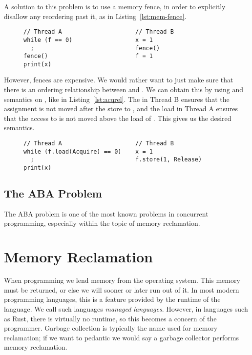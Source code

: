 \documentclass[a4paper,twoside]{report}
\begin{document}
A solution to this problem is to use a memory fence, in order to explicitly
disallow any reordering past it, as in Listing~\ref{lst:mem-fence}.

\begin{figure}[ht]
\begin{lstlisting}[caption=Memory fence for synchronization,label=lst:mem-fence]
// Thread A                     // Thread B
while (f == 0)                  x = 1
  ;                             fence()
fence()                         f = 1
print(x)
\end{lstlisting}
\end{figure}
However, fences are expensive. We would rather want to just make sure that
there is an ordering relationship between  and . We can obtain
this by using  and  semantics on , like in
Listing~\ref{lst:acqrel}. The  in Thread B ensures that the
assignment  is not moved after the store to , and the
 load in Thread A ensures that the access to  is not moved
above the load of . This gives us the desired semantics.
\begin{figure}[ht]
\begin{lstlisting}[caption=Synchronization using orderings,label=lst:acqrel]
// Thread A                     // Thread B
while (f.load(Acquire) == 0)    x = 1
  ;                             f.store(1, Release)
print(x)
\end{lstlisting}
\end{figure}


\section{The ABA Problem}
The ABA problem is one of the most known problems in concurrent programming,
especially within the topic of memory reclamation.


\chapter{Memory Reclamation}

When programming we lend memory from the operating system. This memory must be
returned, or else we will sooner or later run out of it.  In most modern
programming languages, this is a feature provided by the runtime of the
language.  We call such languages \emph{managed languages}.  However, in
languages such as Rust, there is virtually no runtime, so this becomes a
concern of the programmer.  Garbage collection is typically the name used for
memory reclamation; if we want to pedantic we would say a garbage collector
performs memory reclamation.
\end{document}
